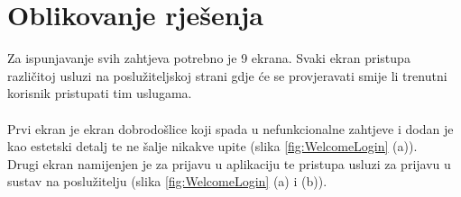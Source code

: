 \documentclass[times, utf8, zavrsni]{fer}
\begin{document}
\chapter{Oblikovanje rješenja}
Za ispunjavanje svih zahtjeva potrebno je 9 ekrana. Svaki ekran pristupa različitoj usluzi na poslužiteljskoj strani gdje
će se provjeravati smije li trenutni korisnik pristupati tim uslugama.\\\\
Prvi ekran je ekran dobrodošlice koji spada u nefunkcionalne zahtjeve i dodan je kao
estetski detalj te ne šalje nikakve upite (slika \ref*{fig:WelcomeLogin} (a)).\\
Drugi ekran namijenjen je za prijavu u aplikaciju te pristupa usluzi za prijavu u sustav
na poslužitelju (slika \ref*{fig:WelcomeLogin} (a) i (b)).
\begin{figure}[h]
      \centering

\end{figure}
\end{document}
